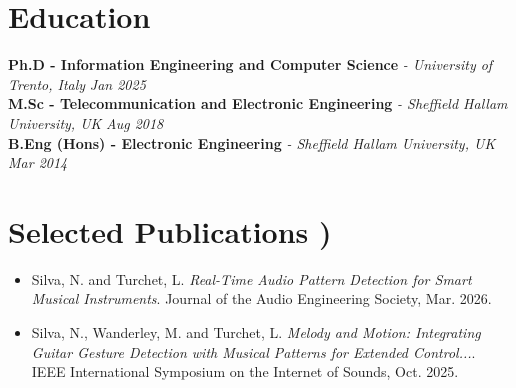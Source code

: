 \documentclass[11pt]{article}
\begin{document}
\vspace{-1em}

\section*{Education}
\textbf{Ph.D - Information Engineering and Computer Science} \textit{\small{ - University of Trento, Italy}} \hfill \textit{Jan 2025}\\[2pt]
\noindent\textbf{M.Sc - Telecommunication and Electronic Engineering} \textit{\small{ - Sheffield Hallam University, UK}} \hfill \textit{Aug 2018}\\[2pt]
\noindent\textbf{B.Eng (Hons) - Electronic Engineering} \textit{\small{ - Sheffield Hallam University, UK}} \hfill \textit{Mar 2014}





\section*{Selected Publications \footnotesize {)}}
\begin{itemize}[leftmargin=1.2em, itemsep=-0.25em]
    \item Silva, N. and Turchet, L. \textit{Real-Time Audio Pattern Detection for Smart Musical Instruments}. Journal of the Audio Engineering Society, Mar. 2026.
    \item Silva, N., Wanderley, M. and Turchet, L. \textit{Melody and Motion: Integrating Guitar Gesture Detection with Musical Patterns for Extended Control...}. IEEE International Symposium on the Internet of Sounds, Oct. 2025.
\end{itemize}


\vspace{-1em}
\end{document}
